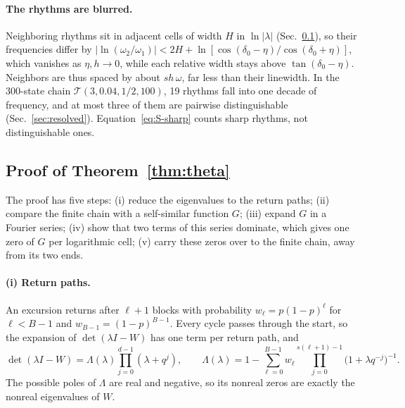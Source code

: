 \paragraph*{The rhythms are blurred.} Neighboring rhythms sit in adjacent cells of width $H$ in $\ln|\lambda|$ (Sec.~\ref{sec:thetaproof}), so their frequencies differ by $|\ln(\omega_2/\omega_1)|<2H+\ln[\cos(\delta_0-\eta)/\cos(\delta_0+\eta)]$, which vanishes as $\eta,h\to0$, while each relative width stays above $\tan(\delta_0-\eta)$. Neighbors are thus spaced by about $sh\,\omega$, far less than their linewidth. In the 300-state chain $\mathcal T(3,0.04,1/2,100)$, 19 rhythms fall into one decade of frequency, and at most three of them are pairwise distinguishable (Sec.~\ref{sec:resolved}). Equation~\eqref{eq:S-sharp} counts sharp rhythms, not distinguishable ones.

\subsection{Proof of Theorem~\ref{thm:theta}}\label{sec:thetaproof}

The proof has five steps: (i) reduce the eigenvalues to the return paths; (ii) compare the finite chain with a self-similar function $G$; (iii) expand $G$ in a Fourier series; (iv) show that two terms of this series dominate, which gives one zero of $G$ per logarithmic cell; (v) carry these zeros over to the finite chain, away from its two ends.

\paragraph*{(i) Return paths.} An excursion returns after $\ell+1$ blocks with probability $w_\ell=p(1-p)^\ell$ for $\ell<B-1$ and $w_{B-1}=(1-p)^{B-1}$. Every cycle passes through the start, so the expansion of $\det(\lambda I-W)$ has one term per return path, and
\begin{equation}
\det(\lambda I-W)=\Lambda(\lambda)\prod_{j=0}^{d-1}(\lambda+q^j),\qquad
\Lambda(\lambda)=1-\sum_{\ell=0}^{B-1}w_\ell\prod_{j=0}^{s(\ell+1)-1}\bigl(1+\lambda q^{-j}\bigr)^{-1}.
\label{eq:S-renewal}
\end{equation}
The possible poles of $\Lambda$ are real and negative, so its nonreal zeros are exactly the nonreal eigenvalues of $W$.

